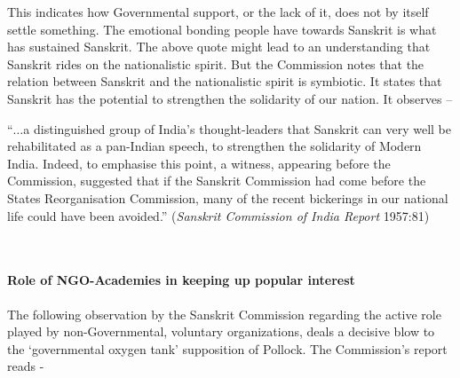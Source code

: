 This indicates how Governmental support, or the lack of it, does not by itself settle something. The emotional bonding people have towards Sanskrit is what has sustained Sanskrit. The above quote might lead to an understanding that Sanskrit rides on the nationalistic spirit. But the Commission notes that the relation between Sanskrit and the nationalistic spirit is symbiotic. It states that Sanskrit has the potential to strengthen the solidarity of our nation. It observes – 

\begin{myquote}
\eleven
“$\ldots$a distinguished group of India's thought-leaders that Sanskrit can very well be rehabilitated as a pan-Indian speech, to strengthen the solidarity of Modern India. Indeed, to emphasise this point, a witness, appearing before the Commission, suggested that if the Sanskrit Commission had come before the States Reorganisation Commission, many of the recent bickerings in our national life could have been avoided.”  \hfill({\sl Sanskrit Commission of India Report} 1957:81)
\end{myquote}

~\\[-40pt]

\paragraph{Role of NGO-Academies in keeping up popular interest}

The following observation by the Sanskrit Commission regarding the active role played by non-Governmental, voluntary organizations, deals a decisive blow to the ‘governmental oxygen tank’ supposition of Pollock. The Commission’s report reads  -  

